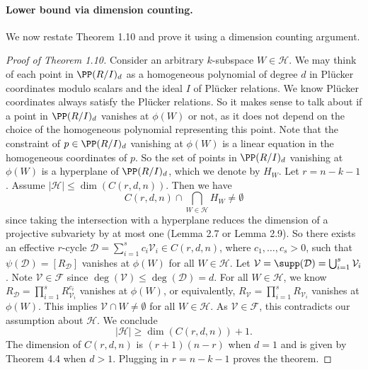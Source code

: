 \paragraph{Lower bound via dimension counting.}
We now restate Theorem 1.10 and prove it using a dimension counting argument.
\begin{proof}[Proof of Theorem 1.10]
Consider an arbitrary $k$-subspace $W\in\mathcal H$. We may think of each point in $\PP(R/I)_d$ as a homogeneous polynomial of degree $d$ in Pl\"ucker coordinates modulo scalars and the ideal $I$ of Pl\"ucker relations. We know Pl\"ucker coordinates always satisfy the Pl\"ucker relations. So it makes sense to talk about if a point in $\PP(R/I)_d$ vanishes at $\phi(W)$ or not, as it does not depend on the choice of the homogeneous polynomial representing this point. Note that the constraint of $p\in\PP(R/I)_d$ vanishing at $\phi(W)$ is a linear equation in the homogeneous coordinates of $p$. So the set of points in $\PP(R/I)_d$ vanishing at $\phi(W)$ is a hyperplane of $\PP(R/I)_d$, which we denote by $H_W$.
Let $r=n-k-1$. Assume $|\mathcal H|\le\dim(C(r,d,n))$. Then we have
\[C(r,d,n)\cap\bigcap_{W\in\mathcal H}H_W\ne\emptyset\]
since taking the intersection with a hyperplane reduces the dimension of a projective subvariety by at most one (Lemma 2.7 or Lemma 2.9). So there exists an effective $r$-cycle $\mathcal D=\sum_{i=1}^s c_i\mathcal V_i\in C(r,d,n)$, where $c_1,\ldots,c_s>0$, such that $\psi(\mathcal D)=[R_{\mathcal D}]$ vanishes at $\phi(W)$ for all $W\in\mathcal H$.
Let $\mathcal V=\supp(\mathcal D)=\bigcup_{i=1}^s\mathcal V_i$. Note $\mathcal V\in\mathcal F$ since $\deg(\mathcal V)\le\deg(\mathcal D)=d$. For all $W\in\mathcal H$, we know $R_{\mathcal D}=\prod_{i=1}^sR_{\mathcal V_i}^{c_i}$ vanishes at $\phi(W)$, or equivalently, $R_{\mathcal V}=\prod_{i=1}^sR_{\mathcal V_i}$ vanishes at $\phi(W)$. This implies $\mathcal V\cap W\ne\emptyset$ for all $W\in\mathcal H$. As $\mathcal V\in\mathcal F$, this contradicts our assumption about $\mathcal H$. We conclude
\[|\mathcal H|\ge\dim(C(r,d,n))+1.\]
The dimension of $C(r,d,n)$ is $(r+1)(n-r)$ when $d=1$ and is given by Theorem 4.4 when $d>1$. Plugging in $r=n-k-1$ proves the theorem.
\end{proof}
